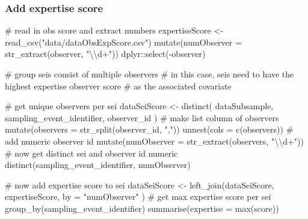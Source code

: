 \documentclass[]{article}
\newenvironment{Shaded}{}{}
\newcommand{\CharTok}[1]{\textcolor[rgb]{0.00,0.50,0.50}{#1}}
\newcommand{\CommentTok}[1]{\textcolor[rgb]{0.00,0.50,0.00}{#1}}
\newcommand{\DataTypeTok}[1]{#1}
\newcommand{\KeywordTok}[1]{\textcolor[rgb]{0.00,0.00,1.00}{#1}}
\newcommand{\NormalTok}[1]{#1}
\newcommand{\OperatorTok}[1]{#1}
\newcommand{\StringTok}[1]{\textcolor[rgb]{0.00,0.50,0.50}{#1}}
\begin{document}
\hypertarget{add-expertise-score}{%
\subsubsection{Add expertise score}\label{add-expertise-score}}

\begin{Shaded}
\begin{Highlighting}[]
\CommentTok{# read in obs score and extract numbers}
\NormalTok{expertiseScore <-}\StringTok{ }\KeywordTok{read_csv}\NormalTok{(}\StringTok{"data/dataObsExpScore.csv"}\NormalTok{) }\OperatorTok{%
\StringTok{  }\KeywordTok{mutate}\NormalTok{(}\DataTypeTok{numObserver =} \KeywordTok{str_extract}\NormalTok{(observer, }\StringTok{"}\CharTok{\textbackslash{}\textbackslash{}}\StringTok{d+"}\NormalTok{)) }\OperatorTok{%
\StringTok{  }\NormalTok{dplyr}\OperatorTok{::}\KeywordTok{select}\NormalTok{(}\OperatorTok{-}\NormalTok{observer)}

\CommentTok{# group seis consist of multiple observers}
\CommentTok{# in this case, seis need to have the highest expertise observer score}
\CommentTok{# as the associated covariate}

\CommentTok{# get unique observers per sei}
\NormalTok{dataSeiScore <-}\StringTok{ }\KeywordTok{distinct}\NormalTok{(}
\NormalTok{  dataSubsample, sampling_event_identifier,}
\NormalTok{  observer_id}
\NormalTok{) }\OperatorTok{%
\StringTok{  }\CommentTok{# make list column of observers}
\StringTok{  }\KeywordTok{mutate}\NormalTok{(}\DataTypeTok{observers =} \KeywordTok{str_split}\NormalTok{(observer_id, }\StringTok{","}\NormalTok{)) }\OperatorTok{%
\StringTok{  }\KeywordTok{unnest}\NormalTok{(}\DataTypeTok{cols =} \KeywordTok{c}\NormalTok{(observers)) }\OperatorTok{%
\StringTok{  }\CommentTok{# add numeric observer id}
\StringTok{  }\KeywordTok{mutate}\NormalTok{(}\DataTypeTok{numObserver =} \KeywordTok{str_extract}\NormalTok{(observers, }\StringTok{"}\CharTok{\textbackslash{}\textbackslash{}}\StringTok{d+"}\NormalTok{)) }\OperatorTok{%
\StringTok{  }\CommentTok{# now get distinct sei and observer id numeric}
\StringTok{  }\KeywordTok{distinct}\NormalTok{(sampling_event_identifier, numObserver)}

\CommentTok{# now add expertise score to sei}
\NormalTok{dataSeiScore <-}\StringTok{ }\KeywordTok{left_join}\NormalTok{(dataSeiScore, expertiseScore,}
  \DataTypeTok{by =} \StringTok{"numObserver"}
\NormalTok{) }\OperatorTok{%
\StringTok{  }\CommentTok{# get max expertise score per sei}
\StringTok{  }\KeywordTok{group_by}\NormalTok{(sampling_event_identifier) }\OperatorTok{%
\StringTok{  }\KeywordTok{summarise}\NormalTok{(}\DataTypeTok{expertise =} \KeywordTok{max}\NormalTok{(score))}

}}}}}}}}
\end{Highlighting}
\end{Shaded}
\end{document}
